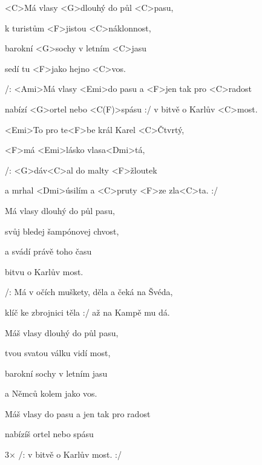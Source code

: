 

\zs
<C>Má vlasy <G>dlouhý do půl <C>pasu,

{k tur}istům <F>jistou <C>náklonnost,

{barokní} <G>sochy v letním <C>jasu

{sedí} tu <F>jako hejno <C>vos.

/: <Ami>Má vlasy <Emi>do pasu a <F>jen tak pro <C>radost

{nabízí} <G>ortel nebo <C(F)>spásu :/ v bitvě o Karlův <C>most.
\ks

\zr
<Emi>To pro te<F>be král Karel <C>Čtvrtý,

<F>má <Emi>lásko vlasa<Dmi>tá,

/: <G>dáv<C>al do malty <F>žloutek

a mrhal <Dmi>úsilím a <C>pruty <F>ze zla<C>ta. :/
\kr

\zs
Má vlasy dlouhý do půl pasu,

svůj bledej šampónovej chvost,

a svádí právě toho času

bitvu o Karlův most.


/: Má v očích muškety, děla a čeká na Švéda,

klíč ke zbrojnici těla :/ až na Kampě mu dá.
\ks


\zr \kr

\zs

Máš vlasy dlouhý do půl pasu,

tvou svatou válku vidí most,

barokní sochy v letním jasu

a Němců kolem jako vos.



Máš vlasy do pasu a jen tak pro radost

nabízíš ortel nebo spásu

3× /: v bitvě o Karlův most. :/
\ks

\kp





